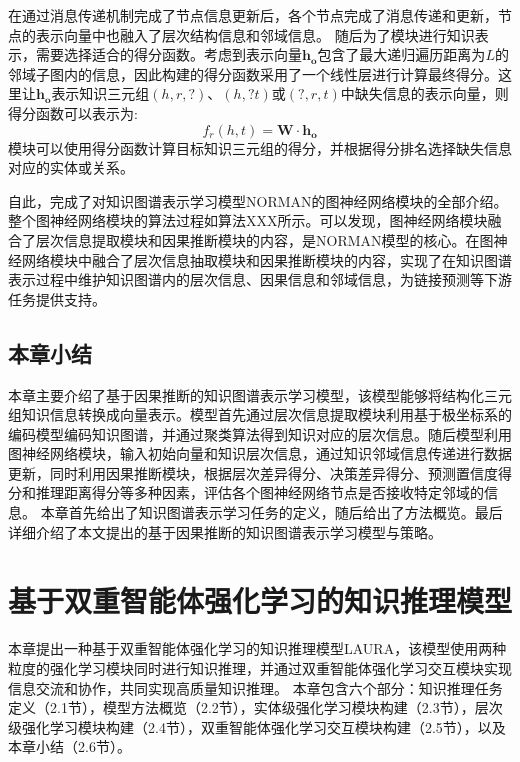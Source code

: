 \documentclass[algorithmlist, AutoFakeBold, AutoFakeSlant, figurelist, tablelist, nomlist, masters]{seuthesix}
\begin{document}
在通过消息传递机制完成了节点信息更新后，各个节点完成了消息传递和更新，节点的表示向量中也融入了层次结构信息和邻域信息。
随后为了模块进行知识表示，需要选择适合的得分函数。考虑到表示向量$\bm{h_o}$包含了最大递归遍历距离为$L$的邻域子图内的信息，因此构建的得分函数采用了一个线性层进行计算最终得分。这里让$\bm{h_o}$表示知识三元组$(h, r, ?)$、$(h, ? t)$或$(?, r, t)$中缺失信息的表示向量，则得分函数可以表示为:
\begin{equation}
  f_{r}(h, t) = \mathbf{W} \cdot \bm{h_o}
  \label{equation_GNNScore}
\end{equation}
模块可以使用得分函数计算目标知识三元组的得分，并根据得分排名选择缺失信息对应的实体或关系。


自此，完成了对知识图谱表示学习模型NORMAN的图神经网络模块的全部介绍。整个图神经网络模块的算法过程如算法XXX所示。可以发现，图神经网络模块融合了层次信息提取模块和因果推断模块的内容，是NORMAN模型的核心。在图神经网络模块中融合了层次信息抽取模块和因果推断模块的内容，实现了在知识图谱表示过程中维护知识图谱内的层次信息、因果信息和邻域信息，为链接预测等下游任务提供支持。


\section{本章小结}
本章主要介绍了基于因果推断的知识图谱表示学习模型，该模型能够将结构化三元组知识信息转换成向量表示。模型首先通过层次信息提取模块利用基于极坐标系的编码模型编码知识图谱，并通过聚类算法得到知识对应的层次信息。随后模型利用图神经网络模块，输入初始向量和知识层次信息，通过知识邻域信息传递进行数据更新，同时利用因果推断模块，根据层次差异得分、决策差异得分、预测置信度得分和推理距离得分等多种因素，评估各个图神经网络节点是否接收特定邻域的信息。
本章首先给出了知识图谱表示学习任务的定义，随后给出了方法概览。最后详细介绍了本文提出的基于因果推断的知识图谱表示学习模型与策略。


\chapter{基于双重智能体强化学习的知识推理模型}
本章提出一种基于双重智能体强化学习的知识推理模型LAURA，该模型使用两种粒度的强化学习模块同时进行知识推理，并通过双重智能体强化学习交互模块实现信息交流和协作，共同实现高质量知识推理。
本章包含六个部分：知识推理任务定义（2.1节），模型方法概览（2.2节），实体级强化学习模块构建（2.3节），层次级强化学习模块构建（2.4节），双重智能体强化学习交互模块构建（2.5节），以及本章小结（2.6节）。
\end{document}
